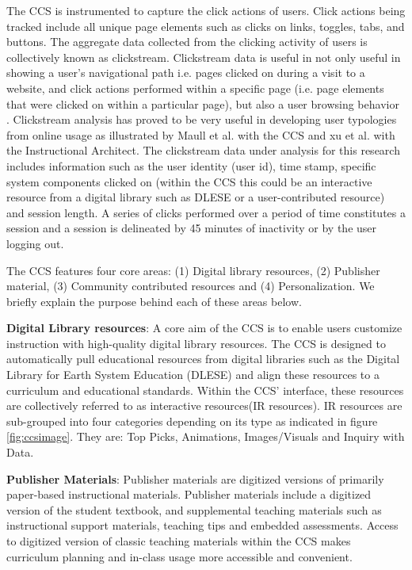 \documentclass{acm_proc_article-sp}
\begin{document}
The CCS is instrumented to capture the click actions of users. Click actions being tracked include all unique page elements such as clicks on links, toggles, tabs, and buttons. The aggregate data collected from the clicking activity of users is collectively known as clickstream. Clickstream data is useful in not only useful in showing a user's navigational path i.e. pages clicked on during a visit to a website, and click actions performed within a specific page (i.e. page elements that were clicked on within a particular page), but also a user browsing behavior \cite{montgomery2004modeling}. Clickstream analysis has proved to be very useful in developing user typologies from online usage as illustrated by Maull et al. \cite{maullunderstanding} with the CCS and xu et al.\cite{xu} with the Instructional Architect. The clickstream data under analysis for this research includes information such as the user identity (user id), time stamp, specific system components clicked on (within the CCS this could be an interactive resource from a digital library such as DLESE or a user-contributed resource) and session length. A series of clicks performed over a period of time constitutes a session and a session is delineated by 45 minutes of inactivity or by the user logging out.

The CCS features four core areas: (1) Digital library resources, (2) Publisher material, (3) Community contributed resources and (4) Personalization. We briefly explain the purpose behind each of these areas below.
 
\textbf{Digital Library resources}:
A core aim of the CCS is to enable users customize instruction with high-quality digital library resources. The CCS is designed to automatically pull educational resources from digital libraries such as the Digital Library for Earth System Education (DLESE) and align these resources to a curriculum and educational standards. Within the CCS' interface, these resources are collectively referred to as interactive resources(IR resources). IR resources are sub-grouped into four categories depending on its type as indicated in figure \ref{fig:ccsimage}. They are: Top Picks, Animations, Images/Visuals and Inquiry with Data. 

\textbf{Publisher Materials}:
Publisher materials are digitized versions of primarily paper-based instructional materials. Publisher materials include a digitized version of the student textbook, and supplemental teaching materials such as instructional support materials, teaching tips and embedded assessments. Access to digitized version of classic teaching materials within the CCS makes curriculum planning and in-class usage more accessible and convenient.
\end{document}
